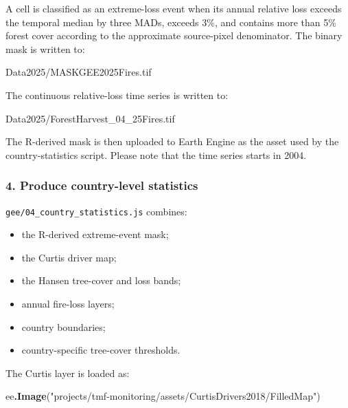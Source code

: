 \documentclass[
]{article}
\newenvironment{Shaded}{\begin{snugshade}}{\end{snugshade}}
\newcommand{\FunctionTok}[1]{\textcolor[rgb]{0.13,0.29,0.53}{\textbf{#1}}}
\newcommand{\NormalTok}[1]{#1}
\newcommand{\OperatorTok}[1]{\textcolor[rgb]{0.81,0.36,0.00}{\textbf{#1}}}
\newcommand{\StringTok}[1]{\textcolor[rgb]{0.31,0.60,0.02}{#1}}
\providecommand{\tightlist}{%
  \setlength{\itemsep}{0pt}\setlength{\parskip}{0pt}}
\begin{document}
A cell is classified as an extreme-loss event when its annual relative
loss exceeds the temporal median by three MADs, exceeds 3\%, and
contains more than 5\% forest cover according to the approximate
source-pixel denominator. The binary mask is written to:

\begin{Shaded}
\begin{Highlighting}[]
\NormalTok{Data2025/MASKGEE2025Fires.tif}
\end{Highlighting}
\end{Shaded}

The continuous relative-loss time series is written to:

\begin{Shaded}
\begin{Highlighting}[]
\NormalTok{Data2025/ForestHarvest\_04\_25Fires.tif}
\end{Highlighting}
\end{Shaded}

The R-derived mask is then uploaded to Earth Engine as the asset used by
the country-statistics script. Please note that the time series starts
in 2004.

\subsubsection{4. Produce country-level
statistics}\label{produce-country-level-statistics}

\texttt{gee/04\_country\_statistics.js} combines:

\begin{itemize}
\tightlist
\item
  the R-derived extreme-event mask;
\item
  the Curtis driver map;
\item
  the Hansen tree-cover and loss bands;
\item
  annual fire-loss layers;
\item
  country boundaries;
\item
  country-specific tree-cover thresholds.
\end{itemize}

The Curtis layer is loaded as:

\begin{Shaded}
\begin{Highlighting}[]
\NormalTok{ee}\OperatorTok{.}\FunctionTok{Image}\NormalTok{(}\StringTok{"projects/tmf{-}monitoring/assets/CurtisDrivers2018/FilledMap"}\NormalTok{)}
\end{Highlighting}
\end{Shaded}
\end{document}
